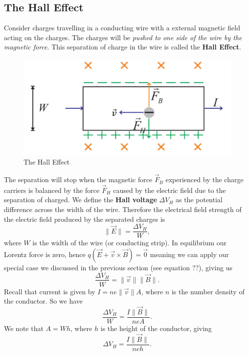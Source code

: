 \subsection{The Hall Effect}    

Consider charges travelling in a conducting wire with a external magnetic field acting on the charges. The charges will be \textit{pushed to one side of the wire by the magnetic force}. This separation of charge in the wire is called the \textbf{Hall Effect}. 

\begin{figure}[h!]
    \centering
    \includegraphics[scale=0.4]{notes/images/Hall-Effect.JPG}
    \caption{The Hall Effect}
\end{figure}
\FloatBarrier

The separation will stop when the magnetic force $\vec{F}_B$ experienced by the charge carriers is balanced by the force $\vec{F}_H$ caused by the electric field due to the separation of charged. We define the \textbf{Hall voltage} $\Delta V_H$ as the potential difference across the width of the wire. Therefore the electrical field strength of the electric field produced by the separated charges is \begin{equation}
    \| \vec{E} \| = \frac{\Delta V_H}{W},
\end{equation}
where $W$ is the width of the wire (or conducting strip). In equilibrium our Lorentz force is zero, hence $q(\vec{E} + \vec{v} \times \vec{B}) = \vec{0}$ meaning we can apply our special case we discussed in the previous section (see equation ??), giving us
\begin{equation}
    \frac{\Delta V_H}{W} = \| \vec{v} \| \| \vec{B}\|.
\end{equation}
Recall that current is given by $I = ne\| \vec{v} \|A$, where $n$ is the number density of the conductor. So we have
\begin{equation}
    \frac{\Delta V_H}{W} = \frac{I\| \vec{B}\|}{neA}.
\end{equation}
We note that $A = Wh$, where $h$ is the height of the conductor, giving
\begin{equation}
    \Delta V_H = \frac{I\| \vec{B}\|}{neh}.
\end{equation}

